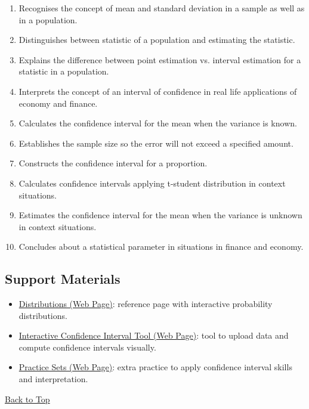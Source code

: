 \begin{enumerate}
	\item Recognises the concept of mean and standard deviation in a sample as well as in a population.
	\item Distinguishes between statistic of a population and estimating the statistic.
	\item Explains the difference between point estimation vs. interval estimation for a statistic in a population.
	\item Interprets the concept of an interval of confidence in real life applications of economy and finance.
	\item Calculates the confidence interval for the mean when the variance is known.
	\item Establishes the sample size so the error will not exceed a specified amount.
	\item Constructs the confidence interval for a proportion.
	\item Calculates confidence intervals applying t-student distribution in context situations.
	\item Estimates the confidence interval for the mean when the variance is unknown in context situations.
	\item Concludes about a statistical parameter in situations in finance and economy.
\end{enumerate}

\subsection{Support Materials}\label{sec:interval-support-materials}

\begin{itemize}
	\item \href{pages/distributions.html}{Distributions (Web Page)}: reference page with interactive probability distributions.
	\item \href{pages/confidence_interval_tool.html}{Interactive Confidence Interval Tool (Web Page)}: tool to upload data and compute confidence intervals visually.
	\item \href{pages/practice_sets.html}{Practice Sets (Web Page)}: extra practice to apply confidence interval skills and interpretation.
\end{itemize}

\vspace{6pt}
\noindent\hyperref[table-of-contents]{Back to Top}
